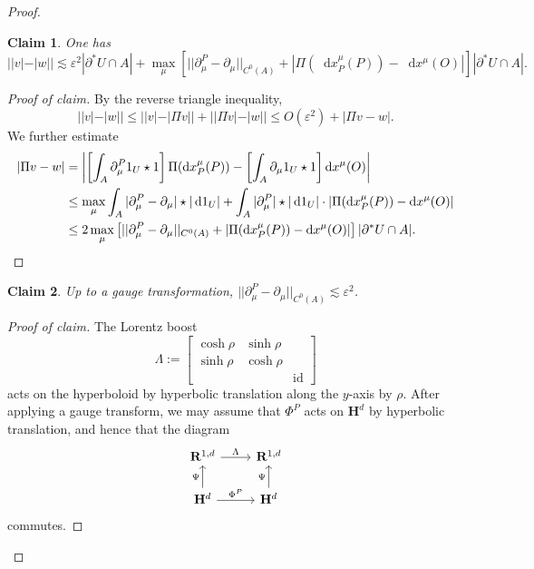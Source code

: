 \documentclass[reqno,10pt]{amsart}
\newcommand{\RR}{\mathbf{R}}
\newcommand{\Hyp}{\mathbf H}
\DeclareMathOperator{\id}{id}
\newcommand*\dif{\mathop{}\!\mathrm{d}}
\newtheorem{claim}{Claim}[theorem]
\theoremstyle{definition}
\numberwithin{equation}{section}
\begin{document}
\begin{proof}
\begin{claim}
One has
$$||v| - |w|| \lesssim \varepsilon^2 |\partial^* U \cap A| + \max_\mu \left[||\partial^P_\mu - \partial_\mu||_{C^0(A)} + |\Pi(\dif x_P^\mu(P)) - \dif x^\mu(O)|\right] |\partial^* U \cap A|.$$
\end{claim}
\begin{proof}[Proof of claim]
By the reverse triangle inequality,
$$||v| - |w|| \leq ||v| - |\Pi v|| + ||\Pi v| - |w|| \leq O(\varepsilon^2) + |\Pi v - w|.$$
We further estimate
\begin{align*}
|\Pi v - w| &= \left|\left[\int_A \partial^P_\mu 1_U \star 1\right] \Pi(\dif x_P^\mu(P)) - \left[\int_A \partial_\mu 1_U \star 1\right] \dif x^\mu(O)\right| \\
&\leq \max_\mu \int_A |\partial^P_\mu - \partial_\mu| \star |\dif 1_U| + \int_A |\partial_\mu^P| \star |\dif 1_U| \cdot |\Pi(\dif x_P^\mu(P)) - \dif x^\mu(O)| \\
&\leq 2 \max_\mu \left[||\partial^P_\mu - \partial_\mu||_{C^0(A)} + |\Pi(\dif x_P^\mu(P)) - \dif x^\mu(O)|\right] |\partial^* U \cap A|. \qedhere
\end{align*}
\end{proof}

\begin{claim}
Up to a gauge transformation, $||\partial^P_\mu - \partial_\mu||_{C^0(A)} \lesssim \varepsilon^2$.
\end{claim}
\begin{proof}[Proof of claim]
The Lorentz boost
$$\Lambda := \begin{bmatrix}\cosh \rho & \sinh \rho \\ \sinh \rho & \cosh \rho \\ &&\id\end{bmatrix}$$
acts on the hyperboloid by hyperbolic translation along the $y$-axis by $\rho$.
After applying a gauge transform, we may assume that $\Phi^P$ acts on $\Hyp^d$ by hyperbolic translation, and hence that the diagram
\begin{equation}\label{compatible isometry diagram}
\begin{tikzcd}
\RR^{1, d} \arrow[r, "\Lambda"] & \RR^{1, d} \\
\Hyp^d \arrow[u, "\Psi"] \arrow[r, "\Phi^P"] & \Hyp^d \arrow[u, "\Psi"]
\end{tikzcd}
\end{equation}
commutes. 


\end{proof}
\end{proof}
\end{document}
